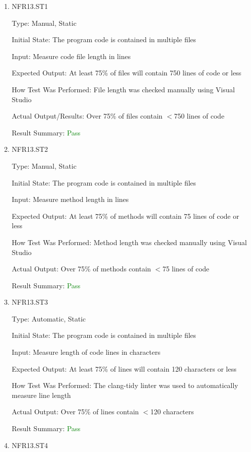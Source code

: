 \documentclass[12pt, titlepage]{article}
\begin{document}
\begin{enumerate}

\item{NFR13.ST1\\}

Type: Manual, Static

Initial State: The program code is contained in multiple files

Input: Measure code file length in lines

Expected Output: At least 75\% of files will contain 750 lines of code or less

How Test Was Performed: File length was checked manually using Visual Studio

Actual Output/Results: Over 75\% of files contain $<$750 lines of code

Result Summary: \textcolor{green} {Pass}

\item{NFR13.ST2\\}

Type: Manual, Static

Initial State: The program code is contained in multiple files

Input: Measure method length in lines

Expected Output: At least 75\% of methods will contain 75 lines of code or less

How Test Was Performed: Method length was checked manually using Visual Studio

Actual Output: Over 75\% of methods contain $<$75 lines of code

Result Summary: \textcolor{green} {Pass}

\item{NFR13.ST3\\}

Type: Automatic, Static

Initial State: The program code is contained in multiple files

Input: Measure length of code lines in characters

Expected Output: At least 75\% of lines will contain 120 characters or less

How Test Was Performed: The clang-tidy linter was used to automatically measure line length

Actual Output: Over 75\% of lines contain $<$120 characters

Result Summary: \textcolor{green} {Pass}

\item{NFR13.ST4\\}


\end{enumerate}
\end{document}
